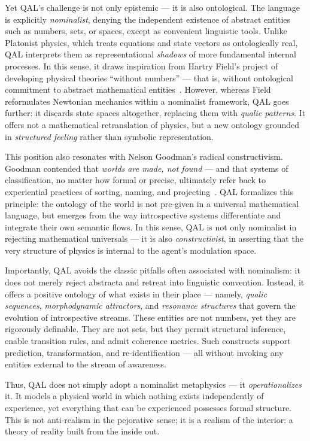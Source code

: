 \documentclass[11pt]{article}
\numberwithin{equation}{section} %
\begin{document}
Yet QAL's challenge is not only epistemic — it is also ontological. The language is explicitly \textit{nominalist}, denying the independent existence of abstract entities such as numbers, sets, or spaces, except as convenient linguistic tools. Unlike Platonist physics, which treats equations and state vectors as ontologically real, QAL interprets them as representational \textit{shadows} of more fundamental internal processes. In this sense, it draws inspiration from Hartry Field’s project of developing physical theories “without numbers” — that is, without ontological commitment to abstract mathematical entities~\cite{field1980}. However, whereas Field reformulates Newtonian mechanics within a nominalist framework, QAL goes further: it discards state spaces altogether, replacing them with \textit{qualic patterns}. It offers not a mathematical retranslation of physics, but a new ontology grounded in \textit{structured feeling} rather than symbolic representation.

This position also resonates with Nelson Goodman’s radical constructivism. Goodman contended that \textit{worlds are made, not found} — and that systems of classification, no matter how formal or precise, ultimately refer back to experiential practices of sorting, naming, and projecting~\cite{goodman1977ways}. QAL formalizes this principle: the ontology of the world is not pre-given in a universal mathematical language, but emerges from the way introspective systems differentiate and integrate their own semantic flows. In this sense, QAL is not only nominalist in rejecting mathematical universals — it is also \textit{constructivist}, in asserting that the very structure of physics is internal to the agent’s modulation space.

Importantly, QAL avoids the classic pitfalls often associated with nominalism: it does not merely reject abstracta and retreat into linguistic convention. Instead, it offers a positive ontology of what exists in their place — namely, \textit{qualic sequences}, \textit{morphodynamic attractors}, and \textit{resonance structures} that govern the evolution of introspective streams. These entities are not numbers, yet they are rigorously definable. They are not sets, but they permit structural inference, enable transition rules, and admit coherence metrics. Such constructs support prediction, transformation, and re-identification — all without invoking any entities external to the stream of awareness.

Thus, QAL does not simply adopt a nominalist metaphysics — it \textit{operationalizes} it. It models a physical world in which nothing exists independently of experience, yet everything that can be experienced possesses formal structure. This is not anti-realism in the pejorative sense; it is a realism of the interior: a theory of reality built from the inside out.
\end{document}
